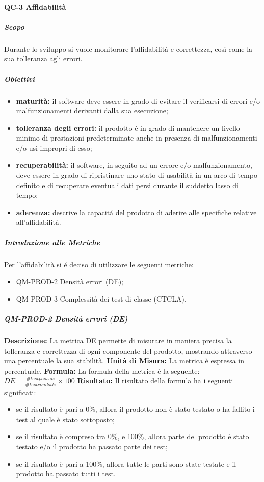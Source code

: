 		\paragraph{QC-3 Affidabilità}
			\subparagraph{Scopo}
				Durante lo sviluppo si vuole monitorare l'affidabilità e correttezza, così come la sua tolleranza agli errori.
			\subparagraph{Obiettivi}
				\begin{itemize}
					\item \textbf{maturità:} il software deve essere in grado di evitare il verificarsi di errori e/o malfunzionamenti derivanti dalla sua esecuzione;
					\item \textbf{tolleranza degli errori:} il prodotto é in grado di mantenere un livello minimo di prestazioni predeterminate anche in presenza di malfunzionamenti e/o usi impropri di esso;
					\item \textbf{recuperabilità:} il software, in seguito ad un errore e/o malfunzionamento, deve essere in grado di ripristinare uno stato di usabilità in un arco di tempo definito e di recuperare eventuali dati persi durante il suddetto lasso di tempo;
					\item \textbf{aderenza:} descrive la capacitá del prodotto di aderire alle specifiche relative all'affidabilità.
				\end{itemize}
			\subparagraph{Introduzione alle Metriche}
				Per l'affidabilità si é deciso di utilizzare le seguenti metriche:
				\begin{itemize}
					\item QM-PROD-2 Densità errori (DE);
					\item QM-PROD-3 Complessità dei test di classe (CTCLA).
				\end{itemize}
			\subparagraph{ QM-PROD-2 Densità errori (DE)}
				\textbf{Descrizione: }
					La metrica DE permette di misurare in maniera precisa la tolleranza e correttezza di ogni componente del prodotto, mostrando attraverso una percentuale la sua stabilità.
				\textbf{Unità di Misura: }
					La metrica è espressa in percentuale.
				\textbf{Formula: }
					La formula della metrica è la seguente:
					\(DE = \frac{\# test passati}{\# test condotti}\times100\)
				\textbf{Risultato: }
					Il risultato della formula ha i seguenti significati:
					\begin{itemize}
						\item se il risultato è pari a 0\%, allora il prodotto non è stato testato o ha fallito i test al quale è stato sottoposto;
						\item se il risultato è compreso tra 0\%, e 100\%, allora parte del prodotto è stato testato e/o il prodotto ha passato parte dei test;
						\item se il risultato è pari a 100\%, allora tutte le parti sono state testate e il prodotto ha passato tutti i test.
					\end{itemize}
